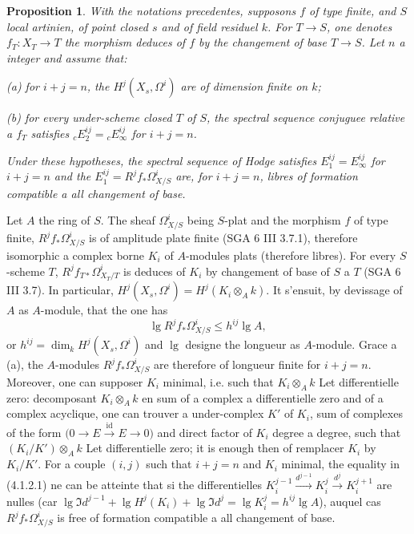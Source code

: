 \documentclass[12pt,a4paper]{article}
\theoremstyle{plain}
\newtheorem{proposition}[theorem]{Proposition}
\theoremstyle{definition}
\theoremstyle{remark}
\DeclareMathOperator{\id}{id}
\begin{document}
\begin{proposition}\label{prop:4.1.2}
With the notations precedentes, supposons $f$ of type finite, and $S$ local artinien, of point closed $s$ and of field residuel $k$. For $T \to S$, one denotes $f_T: X_T \to T$ the morphism deduces of $f$ by the changement of base $T \to S$. Let $n$ a integer and assume that:

\textup{(a)} for $i + j = n$, the $H^j(X_s, \Omega^i)$ are of dimension finite on $k$;

\textup{(b)} for every under-scheme closed $T$ of $S$, the spectral sequence conjuguee relative a $f_T$ satisfies ${}_c E_2^{ij} = {}_c E_\infty^{ij}$ for $i + j = n$.

Under these hypotheses, the spectral sequence of Hodge satisfies $E_1^{ij} = E_\infty^{ij}$ for $i + j = n$ and the $E_1^{ij} = R^j f_* \Omega^i_{X/S}$ are, for $i + j = n$, libres of formation compatible a all changement of base.
\end{proposition}

Let $A$ the ring of $S$. The sheaf $\Omega^i_{X/S}$ being $S$-plat and the morphism $f$ of type finite, $R^j f_* \Omega^i_{X/S}$ is of amplitude plate finite (SGA 6 III 3.7.1), therefore isomorphic a complex borne $K_i$ of $A$-modules plats (therefore libres). For every $S$-scheme $T$, $R^j f_{T*} \Omega^i_{X_T/T}$ is deduces of $K_i$ by changement of base of $S$ a $T$ (SGA 6 III 3.7). In particular, $H^j(X_s, \Omega^i) = H^j(K_i \otimes_A k)$. It s'ensuit, by devissage of $A$ as $A$-module, that the one has
\begin{equation}\label{eq:4.1.2.1}
\lg R^j f_* \Omega^i_{X/S} \le h^{ij} \lg A,
\end{equation}
or $h^{ij} = \dim_k H^j(X_s, \Omega^i)$ and $\lg$ designe the longueur as $A$-module. Grace a (a), the $A$-modules $R^j f_* \Omega^i_{X/S}$ are therefore of longueur finite for $i + j = n$. Moreover, one can supposer $K_i$ minimal, i.e. such that $K_i \otimes_A k$ Let differentielle zero: decomposant $K_i \otimes_A k$ en sum of a complex a differentielle zero and of a complex acyclique, one can trouver a under-complex $K'$ of $K_i$, sum of complexes of the form $\bigl(0 \to E \xrightarrow{\id} E \to 0\bigr)$ and direct factor of $K_i$ degree a degree, such that $(K_i/K') \otimes_A k$ Let differentielle zero; it is enough then of remplacer $K_i$ by $K_i/K'$. For a couple $(i,j)$ such that $i + j = n$ and $K_i$ minimal, the equality in (4.1.2.1) ne can be atteinte that si the differentielles $K_i^{j-1} \xrightarrow{d^{j-1}} K_i^j \xrightarrow{d^j} K_i^{j+1}$ are nulles (car $\lg \Im d^{j-1} + \lg H^j(K_i) + \lg \Im d^j = \lg K_i^j = h^{ij} \lg A$), auquel cas $R^j f_* \Omega^i_{X/S}$ is free of formation compatible a all changement of base.
\end{document}
